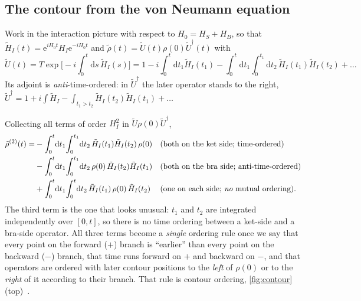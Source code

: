 \documentclass[11pt]{article}
\newcommand{\ee}{\mathrm{e}}
\newcommand{\dd}{\mathrm{d}}
\begin{document}
\subsection{The contour from the von Neumann equation}
\label{sec:contour-from-vN}

Work in the interaction picture with respect to $H_0=H_S+H_B$, so that
$\tilde H_I(t)=\ee^{iH_0t}H_I\ee^{-iH_0t}$ and $\tilde\rho(t)=\tilde U(t)\rho(0)\tilde U^\dagger(t)$ with
\begin{equation}
  \tilde U(t)=T\exp\Big[-i\!\int_0^t\!\dd s\,\tilde H_I(s)\Big]
  =1-i\!\int_0^t\!\dd t_1\tilde H_I(t_1)-\!\int_0^t\!\dd t_1\!\int_0^{t_1}\!\dd t_2\,\tilde H_I(t_1)\tilde H_I(t_2)+\dots
\end{equation}
Its adjoint is \emph{anti}-time-ordered: in $\tilde U^\dagger$ the later operator stands to
the right, $\tilde U^\dagger=1+i\int\tilde H_I-\int_{t_1>t_2}\tilde H_I(t_2)\tilde H_I(t_1)+\dots$

\begin{keybox}
Collecting all terms of order $H_I^2$ in $\tilde U\rho(0)\tilde U^\dagger$,
\begin{align}
  \tilde\rho^{(2)}(t)=&-\int_0^t\!\dd t_1\!\int_0^{t_1}\!\dd t_2\,\tilde H_I(t_1)\tilde H_I(t_2)\,\rho(0)
   &&\text{(both on the ket side; time-ordered)}\notag\\
  &-\int_0^t\!\dd t_1\!\int_0^{t_1}\!\dd t_2\,\rho(0)\,\tilde H_I(t_2)\tilde H_I(t_1)
   &&\text{(both on the bra side; anti-time-ordered)}\notag\\
  &+\int_0^t\!\dd t_1\!\int_0^{t}\!\dd t_2\,\tilde H_I(t_1)\,\rho(0)\,\tilde H_I(t_2)
   &&\text{(one on each side; \emph{no} mutual ordering)}.
  \label{eq:rho2}
\end{align}
The third term is the one that looks unusual: $t_1$ and $t_2$ are integrated
independently over $[0,t]$, so there is no time ordering between a ket-side and a
bra-side operator. All three terms become a \emph{single} ordering rule once we say that
every point on the forward ($+$) branch is ``earlier'' than every point on the backward
($-$) branch, that time runs forward on $+$ and backward on $-$, and that operators are
ordered with later contour positions to the \emph{left} of $\rho(0)$ or to the \emph{right}
of it according to their branch. That rule is contour ordering, \cref{fig:contour}
(top)~\cite{Schwinger1961,Keldysh1964}.
\end{keybox}
\end{document}
